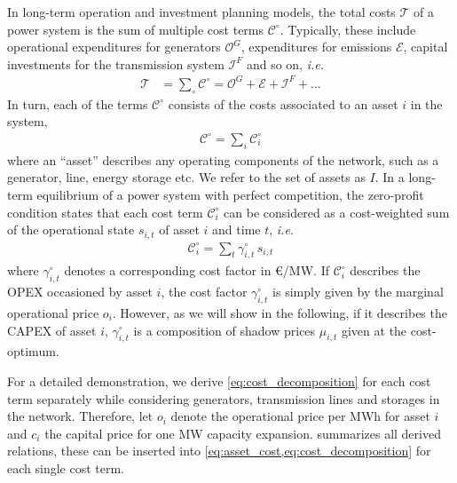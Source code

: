 \documentclass[11pt,twocolumn]{article}
\newcommand{\ie}{\textit{i.e.} }
\newcommand{\state}[1][i]{s_{#1,t}}
\newcommand{\costfactor}{\gamma^\circ_{i,t}}
\newcommand{\totalcost}{\mathcal{T}}
\newcommand{\cost}[1][\circ]{\mathcal{C}^{#1}}
\newcommand{\opexgeneration}{\mathcal{O}^G}
\newcommand{\capexflow}{\mathcal{I}^F}
\newcommand{\emissioncost}{\mathcal{E}}
\begin{document}
In long-term operation and investment planning models, the total costs $\totalcost$ of a power system is the sum of multiple cost terms $\cost$. Typically, these include operational expenditures for generators $\opexgeneration$, expenditures for emissions $\emissioncost$,  capital investments for the transmission system $\capexflow$ and so on, \ie
\begin{align}
\totalcost &= \sum_\circ \cost = \opexgeneration + \emissioncost +  \capexflow + ...
\label{eq:total_cost}
\end{align}
In turn, each of the terms $\cost$ consists of the costs associated to an asset $i$ in the system, 
\begin{align}
    \cost = \sum_{i} \cost_{i}
    \label{eq:asset_cost}
\end{align} 
where an ``asset'' describes any operating components of the network, such as a generator, line, energy storage etc. We refer to the set of assets as $I$. 
In a long-term equilibrium of a power system with perfect competition, the zero-profit condition states that each cost term $\cost_{i}$ can be considered as a cost-weighted sum of the operational state $s_{i,t}$ of asset $i$ and time $t$, \ie
\begin{align}
    \cost_{i} = \sum_t  \costfactor \, \state
    \label{eq:cost_decomposition}
\end{align}
where $\costfactor$ denotes a corresponding cost factor in \euro/MW. 
If $\cost_i$ describes the OPEX occasioned by asset $i$, the cost factor $\costfactor$ is simply given by the marginal operational price $o_i$. However, as we will show in the following, if it describes the CAPEX of asset $i$, $\costfactor$ is a composition of shadow prices $\mu_{i,t}$ given at the cost-optimum. 

For a detailed demonstration, we derive  \cref{eq:cost_decomposition} for each cost term separately while considering generators, transmission lines and storages in the network. Therefore, let $o_i$ denote the operational price per MWh for asset $i$ and $c_i$ the capital price for one MW capacity expansion.  summarizes all derived relations, these can be inserted into \cref{eq:asset_cost,eq:cost_decomposition} for each single cost term.
\end{document}
